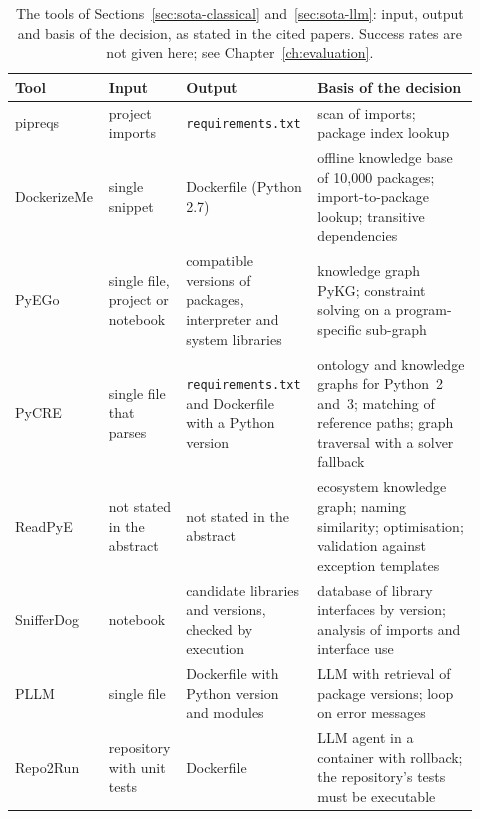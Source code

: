\begin{table}[ht]
  \centering
  \caption{The tools of Sections~\ref{sec:sota-classical} and~\ref{sec:sota-llm}: input, output and basis of the decision, as stated in the cited papers. Success rates are not given here; see Chapter~\ref{ch:evaluation}.}
  \label{tab:sota-tools}
  \small
  \begin{tabular}{@{}>{\raggedright\arraybackslash}p{0.17\linewidth}>{\raggedright\arraybackslash}p{0.16\linewidth}>{\raggedright\arraybackslash}p{0.25\linewidth}>{\raggedright\arraybackslash}p{0.34\linewidth}@{}}
    \hline
    Tool & Input & Output & Basis of the decision \\
    \hline
    pipreqs \cite{pipreqs} & project imports & \texttt{requirements.txt} & scan of imports; package index lookup \\
    DockerizeMe \cite{horton2019dockerizeme} & single snippet & Dockerfile (Python 2.7) & offline knowledge base of 10{,}000 packages; import-to-package lookup; transitive dependencies \\
    PyEGo \cite{ye2022pyego} & single file, project or notebook & compatible versions of packages, interpreter and system libraries & knowledge graph PyKG; constraint solving on a program-specific sub-graph \\
    PyCRE \cite{cheng2022pycre} & single file that parses & \texttt{requirements.txt} and Dockerfile with a Python version & ontology and knowledge graphs for Python~2 and~3; matching of reference paths; graph traversal with a solver fallback \\
    ReadPyE \cite{cheng2024revisiting} & not stated in the abstract & not stated in the abstract & ecosystem knowledge graph; naming similarity; optimisation; validation against exception templates \\
    SnifferDog \cite{wang2021sniffer} & notebook & candidate libraries and versions, checked by execution & database of library interfaces by version; analysis of imports and interface use \\
    PLLM \cite{bartlett2025lastdependency} & single file & Dockerfile with Python version and modules & \ac{LLM} with retrieval of package versions; loop on error messages \\
    Repo2Run \cite{hu2025repo2run} & repository with unit tests & Dockerfile & \ac{LLM} agent in a container with rollback; the repository's tests must be executable \\
    \hline
  \end{tabular}
\end{table}


